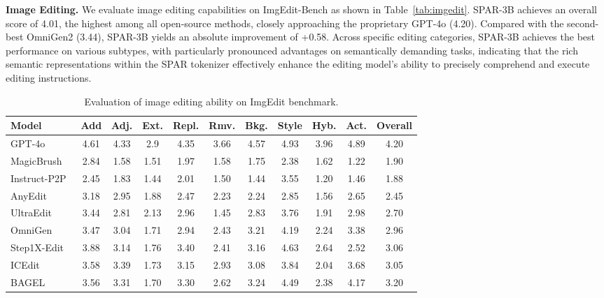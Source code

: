 \documentclass[runningheads]{llncs}
\begin{document}
\noindent\textbf{Image Editing.}
We evaluate image editing capabilities on ImgEdit-Bench as shown in Table~\ref{tab:imgedit}. SPAR-3B achieves an overall score of 4.01, the highest among all open-source methods, closely approaching the proprietary GPT-4o (4.20). Compared with the second-best OmniGen2 (3.44), SPAR-3B yields an absolute improvement of +0.58.
Across specific editing categories, SPAR-3B achieves the best performance on various subtypes, with particularly pronounced advantages on semantically demanding tasks, indicating that the rich semantic representations within the SPAR tokenizer effectively enhance the editing model's ability to precisely comprehend and execute editing instructions.




\begin{table}[t]
\small
\centering
\caption{{Evaluation of image editing ability on ImgEdit benchmark.} }
\vspace{-10pt}
\begin{tabular}{lcccccccccc}
\toprule
\textbf{Model} & \textbf{Add} & \textbf{Adj.} & \textbf{Ext.} & \textbf{Repl.} & \textbf{Rmv.} & \textbf{Bkg.} & \textbf{Style} & \textbf{Hyb.} & \textbf{Act.} & \textbf{Overall} \\
\midrule
GPT-4o~\cite{openai2025introducing4o} & 4.61 & 4.33 & 2.9 & 4.35 & 3.66 & 4.57 & 4.93 & 3.96 & 4.89 & 4.20 \\
\midrule
MagicBrush~\cite{zhang2023magicbrush} & 2.84 & 1.58 & 1.51 & 1.97 & 1.58 & 1.75 & 2.38 & 1.62 & 1.22 & 1.90 \\
Instruct-P2P~\cite{brooks2023instructpix2pix} & 2.45 & 1.83 & 1.44 & 2.01 & 1.50 & 1.44 & 3.55 & 1.20 & 1.46 & 1.88 \\
AnyEdit~\cite{yu2025anyedit} & 3.18 & 2.95 & 1.88 & 2.47 & 2.23 & 2.24 & 2.85 & 1.56 & 2.65 & 2.45 \\
UltraEdit~\cite{zhao2024ultraedit} & 3.44 & 2.81 & 2.13 & 2.96 & 1.45 & 2.83 & 3.76 & 1.91 & 2.98 & 2.70 \\
OmniGen~\cite{xiao2025omnigen} & 3.47 & 3.04 & 1.71 & 2.94 & 2.43 & 3.21 & 4.19 & 2.24 & 3.38 & 2.96 \\
Step1X-Edit~\cite{liu2025step1x} & 3.88 & 3.14 & 1.76 & 3.40 & 2.41 & 3.16 & 4.63 & 2.64 & 2.52 & 3.06 \\
ICEdit~\cite{zhang2025enabling} & 3.58 & 3.39 & 1.73 & 3.15 & 2.93 & 3.08 & 3.84 & 2.04 & 3.68 & 3.05 \\
BAGEL~\cite{deng2025bagel} & 3.56 & 3.31 & 1.70 & 3.30 & 2.62 & 3.24 & 4.49 & 2.38 & 4.17 & 3.20 \\

\end{tabular}
\end{table}
\end{document}
